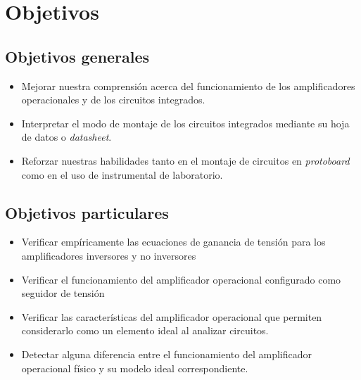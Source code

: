 \section{Objetivos}

\subsection{Objetivos generales}

\begin{itemize}
    \item Mejorar nuestra comprensión acerca del funcionamiento de los
    amplificadores operacionales y de los circuitos integrados.
    \item Interpretar el modo de montaje de los circuitos integrados mediante
    su hoja de datos o \textit{datasheet}.
    \item Reforzar nuestras habilidades tanto en el montaje de circuitos en 
    \textit{protoboard} como en el uso de instrumental de laboratorio.
\end{itemize}

\subsection{Objetivos particulares}

\begin{itemize}
    \item Verificar empíricamente las ecuaciones de ganancia de tensión para 
    los amplificadores inversores y no inversores
    \item Verificar el funcionamiento del amplificador operacional configurado
    como seguidor de tensión
    \item Verificar las características del amplificador operacional que 
    permiten considerarlo como un elemento ideal al analizar circuitos.
    \item Detectar alguna diferencia entre el funcionamiento del amplificador 
    operacional físico y su modelo ideal correspondiente.
\end{itemize}

